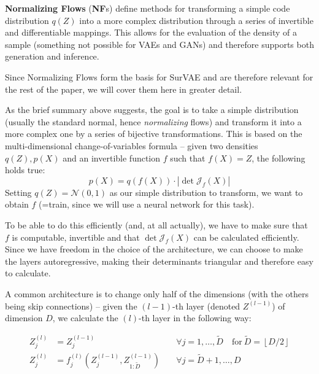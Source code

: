 \textbf{Normalizing Flows} (\textbf{NF}s) \cite{rezende2016nf} define methods for transforming a simple code distribution $q(Z)$ into a more complex distribution through a series of invertible and differentiable mappings. 
This allows for the evaluation of the density of a sample (something not possible for VAEs and GANs) and therefore supports both generation and inference.


\label{sec:nf_explanation}

Since Normalizing Flows form the basis for SurVAE and are therefore relevant for the rest of the paper, we will cover them here in greater detail.

As the brief summary above suggests, the goal is to take a simple distribution (usually the standard normal, hence \textit{normalizing} flows) and transform it into a more complex one by a series of bijective transformations.
This is based on the multi-dimensional change-of-variables formula -- given two densities $q(Z), p(X)$ and an invertible function $f$ such that $f(X) = Z$, the following holds true: \begin{equation}
 p(X) = q(f(X)) \cdot | \det \mathcal{J}_f (X) |   
\end{equation}\label{eq:p-bij}%
Setting $q(Z) = \mathcal{N}(0, 1)$ as our simple distribution to transform, we want to obtain $f$ (=train, since we will use a neural network for this task).

To be able to do this efficiently (and, at all actually), we have to make sure that $f$ is computable, invertible and that $\det \mathcal{J}_f (X)$ can be calculated efficiently.
Since we have freedom in the choice of the architecture, we can choose to make the layers autoregressive, making their determinants triangular and therefore easy to calculate.

A common architecture is to change only half of the dimensions (with the others being skip connections) -- given the $(l-1)$-th layer (denoted $Z^{(l-1)}$) of dimension $D$, we calculate the $(l)$-th layer in the following way:

\[\begin{aligned}
	Z_{j}^{(l)} &= Z_{j}^{(l-1)} \; &&\forall j=1, \ldots, \tilde D \quad \text{for}\ \tilde D = \left\lfloor D/2 \right\rfloor \\ Z_j^{(l)} &= f_j^{(l)} \left(Z_j^{(l-1)}, Z_{1:\tilde D}^{(l-1)}\right) \; &&\forall j = \tilde D + 1, \ldots, D
\end{aligned}\]

